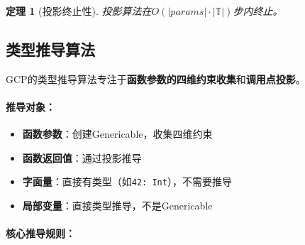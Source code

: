\documentclass[UTF8]{article}
\newtheorem{theorem}{定理}[section]
\begin{document}
\begin{theorem}[投影终止性]
\label{thm:projection}
投影算法在$O(|\mathit{params}| \cdot |\mathbb{T}|)$步内终止。
\end{theorem}

\subsection{类型推导算法}
\label{sec:algorithm}

GCP的类型推导算法专注于\textbf{函数参数的四维约束收集}和\textbf{调用点投影}。

\paragraph{推导对象：}
\begin{itemize}[leftmargin=2em]
\item[$\checkmark$] \textbf{函数参数}：创建Genericable，收集四维约束
\item[$\checkmark$] \textbf{函数返回值}：通过投影推导
\item[$\times$] \textbf{字面量}：直接有类型（如\texttt{42: Int}），不需要推导
\item[$\times$] \textbf{局部变量}：直接类型推导，不是Genericable
\end{itemize}

\paragraph{核心推导规则：}
\end{document}
